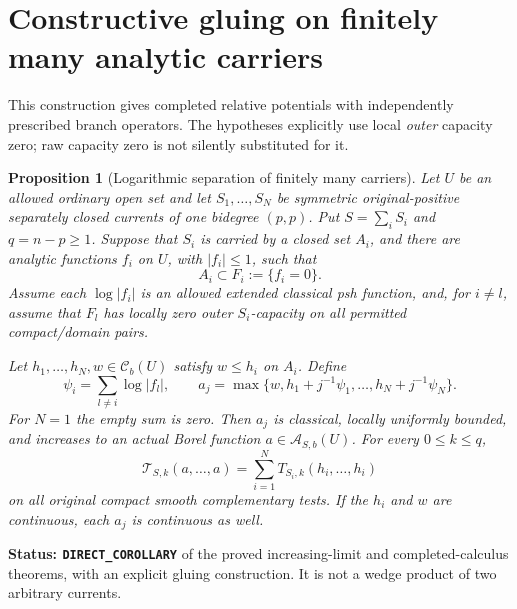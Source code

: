 \documentclass[11pt,a4paper]{article}
\numberwithin{equation}{section}
\newtheorem{proposition}[theorem]{Proposition}
\theoremstyle{definition}
\theoremstyle{remark}
\begin{document}


\section{Constructive gluing on finitely many analytic carriers}
\label{sec:r3-finite-carrier-completed-gluing}

This construction gives completed relative potentials with
independently prescribed branch operators. The hypotheses explicitly
use local \emph{outer} capacity zero; raw capacity zero is not
silently substituted for it.

\begin{proposition}[Logarithmic separation of finitely many carriers]
\label{prop:r3-finite-carrier-completed-gluing}
Let $U$ be an allowed ordinary open set and let
$S_1,\ldots,S_N$ be symmetric original-positive separately closed
currents of one bidegree $(p,p)$. Put
$S=\sum_iS_i$ and $q=n-p\geq1$. Suppose that $S_i$ is
carried by a closed set $A_i$, and there are analytic functions
$f_i$ on $U$, with $|f_i|\leq1$, such that
\[
 A_i\subset F_i:=\{f_i=0\}.
\]
Assume each $\log|f_i|$ is an allowed extended classical psh
function, and, for $i\ne l$, assume that $F_l$ has locally
zero outer $S_i$-capacity on all permitted compact/domain pairs.

Let $h_1,\ldots,h_N,w\in\mathcal C_b(U)$ satisfy
$w\leq h_i$ on $A_i$. Define
\[
 \psi_i=\sum_{l\ne i}\log|f_l|,
 \qquad
 a_j=\max\{w,h_1+j^{-1}\psi_1,\ldots,
                         h_N+j^{-1}\psi_N\}.
\]
For $N=1$ the empty sum is zero. Then $a_j$ is classical,
locally uniformly bounded, and increases to an actual Borel
function $a\in\mathcal A_{S,b}(U)$. For every $0\leq k\leq q$,
\begin{equation}
 \mathcal T_{S,k}(a,\ldots,a)
       =\sum_{i=1}^N T_{S_i,k}(h_i,\ldots,h_i)
 \label{eq:r3-finite-carrier-glued-operator}
\end{equation}
on all original compact smooth complementary tests. If the
$h_i$ and $w$ are continuous, each $a_j$ is continuous as well.
\end{proposition}

\noindent\textbf{Status: \texttt{DIRECT\_COROLLARY}} of the
proved increasing-limit and completed-calculus theorems, with
an explicit gluing construction. It is not a wedge product of
two arbitrary currents.
\end{document}
